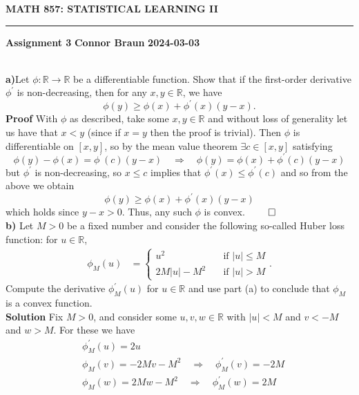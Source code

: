\documentclass[10pt]{article}
\newcommand{\mbb}[1]{\mathbb{#1}}
\newcommand{\1}[1]{\mathbbm{1}_{#1}}
\begin{document}
    \begin{center}
        {\bf\large{MATH 857: STATISTICAL LEARNING II}}
        \smallskip
        \hrule
        \smallskip
        {\bf Assignment 3} \hfill {\bf Connor Braun} \hfill {\bf 2024-03-03}
    \end{center}
    \\[5pt]
    {\bf a)}\hspace{5pt}Let $\phi:\mathbb{R}\rightarrow\mbb{R}$ be a differentiable function. Show that if the first-order
    derivative $\phi^\prime$ is non-decreasing, then for any $x,y\in\mbb{R}$, we have
    \[\phi(y)\geq \phi(x)+\phi^\prime(x)(y-x).\]
    {\bf Proof}\hspace{5pt} With $\phi$ as described, take some $x,y\in\mathbb{R}$ and without loss of generality let us have that $x<y$ (since if $x=y$ then the proof is trivial). 
    Then $\phi$ is differentiable on $[x,y]$, so by the mean value theorem $\exists c\in[x,y]$ satisfying
    \[\phi(y)-\phi(x)=\phi^\prime(c)(y-x)\quad\Rightarrow\quad \phi(y)=\phi(x)+\phi^\prime(c)(y-x)\]
    but $\phi^\prime$ is non-decreasing, so $x\leq c$ implies that $\phi^\prime(x)\leq \phi^\prime(c)$ and so from the above we obtain
    \[\phi(y)\geq \phi(x)+\phi^\prime(x)(y-x)\]
    which holds since $y-x>0$. Thus, any such $\phi$ is convex. \hfill{$\qed$}\\[5pt]
    {\bf b)}\hspace{5pt} Let $M>0$ be a fixed number and consider the following so-called Huber loss function: for $u\in\mbb{R}$,
    \begin{align*}
        \phi_M(u)&=\begin{cases}
            u^2\quad&\text{if $|u|\leq M$}\\
            2M|u|-M^2\quad&\text{if $|u|>M$}
        \end{cases}.
    \end{align*}
    Compute the derivative $\phi^\prime_M(u)$ for $u\in\mbb{R}$ and use part (a) to conclude that $\phi_M$ is a convex function.\\[5pt]
    {\bf Solution}\hspace{5pt} Fix $M>0$, and consider some $u,v,w\in\mbb{R}$ with $|u|<M$ and $v<-M$ and $w>M$. For these we have
    \begin{align*}
        &\phi_M^\prime(u)=2u\\
        &\phi_M(v)=-2Mv-M^2\quad\Rightarrow\quad \phi^\prime_M(v)=-2M\\
        &\phi_M(w)=2Mw-M^2\quad\Rightarrow\quad\phi^\prime_M(w)=2M
    \end{align*}
\end{document}
